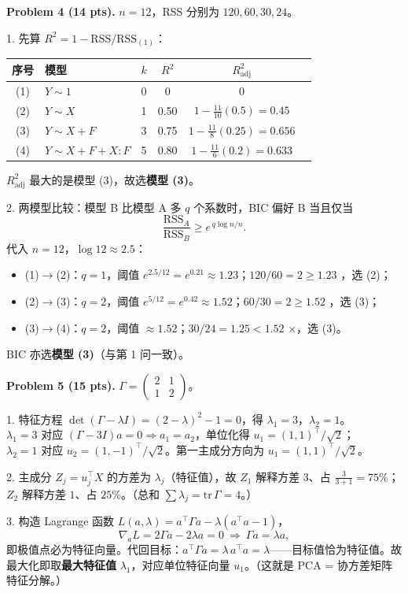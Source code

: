 \documentclass[11pt]{ctexart}
\newcommand{\ans}[1]{{\color{red}#1}}
\begin{document}
\noindent\textbf{Problem 4 (14 pts).} $n = 12$，RSS 分别为 $120, 60, 30, 24$。

\ans{
1. 先算 $R^2 = 1 - \mathrm{RSS}/\mathrm{RSS}_{(1)}$：
\begin{center}
\begin{tabular}{clcccc}
\toprule
序号 & 模型 & $k$ & $R^2$ & $R^2_{\mathrm{adj}}$ & \\
\midrule
(1) & $Y \sim 1$ & 0 & 0 & 0 & \\
(2) & $Y \sim X$ & 1 & 0.50 & $1 - \frac{11}{10}(0.5) = 0.45$ & \\
(3) & $Y \sim X + F$ & 3 & 0.75 & $1 - \frac{11}{8}(0.25) = 0.656$ & \\
(4) & $Y \sim X + F + X{:}F$ & 5 & 0.80 & $1 - \frac{11}{6}(0.2) = 0.633$ & \\
\bottomrule
\end{tabular}
\end{center}
$R^2_{\mathrm{adj}}$ 最大的是模型 (3)，故选\textbf{模型 (3)}。

2. 两模型比较：模型 B 比模型 A 多 $q$ 个系数时，BIC 偏好 B 当且仅当
\[
\frac{\mathrm{RSS}_A}{\mathrm{RSS}_B} \geq e^{\,q\log n / n}.
\]
代入 $n = 12$，$\log 12 \approx 2.5$：
\begin{itemize}
\item (1)$\to$(2)：$q=1$，阈值 $e^{2.5/12} = e^{0.21} \approx 1.23$；$120/60 = 2 \geq 1.23$ \checkmark，选 (2)；
\item (2)$\to$(3)：$q=2$，阈值 $e^{5/12} = e^{0.42} \approx 1.52$；$60/30 = 2 \geq 1.52$ \checkmark，选 (3)；
\item (3)$\to$(4)：$q=2$，阈值 $\approx 1.52$；$30/24 = 1.25 < 1.52$ $\times$，选 (3)。
\end{itemize}
BIC 亦选\textbf{模型 (3)}（与第 1 问一致）。
}

\noindent\textbf{Problem 5 (15 pts).} $\Gamma = \begin{pmatrix} 2 & 1 \\ 1 & 2 \end{pmatrix}$。

\ans{
1. 特征方程 $\det(\Gamma - \lambda I) = (2-\lambda)^2 - 1 = 0$，得 $\lambda_1 = 3$，$\lambda_2 = 1$。\\
$\lambda_1 = 3$ 对应 $(\Gamma - 3I)a = 0 \Rightarrow a_1 = a_2$，单位化得 $u_1 = (1, 1)^{\top}/\sqrt{2}$；\\
$\lambda_2 = 1$ 对应 $u_2 = (1, -1)^{\top}/\sqrt{2}$。第一主成分方向为 $u_1 = (1,1)^{\top}/\sqrt{2}$。

2. 主成分 $Z_j = u_j^{\top}X$ 的方差为 $\lambda_j$（特征值），故 $Z_1$ 解释方差 $3$、占 $\frac{3}{3+1} = 75\%$；$Z_2$ 解释方差 $1$、占 $25\%$。（总和 $\sum\lambda_j = \mathrm{tr}\,\Gamma = 4$。）

3. 构造 Lagrange 函数 $L(a, \lambda) = a^{\top}\Gamma a - \lambda(a^{\top}a - 1)$，
\[
\nabla_a L = 2\Gamma a - 2\lambda a = 0 \ \Longrightarrow\ \Gamma a = \lambda a,
\]
即极值点必为特征向量。代回目标：$a^{\top}\Gamma a = \lambda\, a^{\top}a = \lambda$——目标值恰为特征值。故最大化即取\textbf{最大特征值} $\lambda_1$，对应单位特征向量 $u_1$。（这就是 PCA = 协方差矩阵特征分解。）
}
\end{document}
